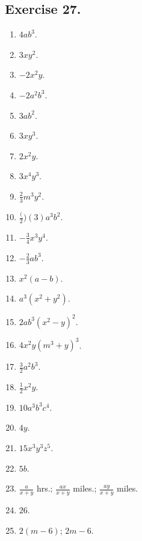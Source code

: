 \documentclass{book}
\begin{document}
\subsection*{Exercise 27.}
\begin{enumerate}

\item $4ab^3$.

\item $3xy^2$.

\item $- 2x^2y$.

\item $- 2a^2b^3$.

\item $3ab^2$.

\item $3xy^3$.

\item $2x^2y$.

\item $3x^4y^3$.

\item $\frac{2}{3} m^3y^2$.

\item $\frac(2)(3) a^3b^2$.

\item $- \frac{3}{4} x^3y^4$.

\item $- \frac{2}{3} ab^3$.

\item $x^2(a - b)$.

\item $a^3(x^2 + y^2)$.

\item $2ab^3\left(x^2 - y\right)^2$.

\item $4x^2y\left(m^3 + y\right)^3$.

\item $\frac{3}{2}a^2b^3$.

\item $\frac{1}{2}x^2y$.

\item $10a^3b^3c^4$.

\item $4y$.

\item $15x^3y^3z^5$.

\item $5b$.

\item $\displaystyle \frac{a}{x + y}$ hrs.; $\displaystyle
\frac{ax}{x + y}$ miles.; $\displaystyle \frac{ay}{x + y}$ miles.

\item $26$.

\item $2(m - 6)$; $2m - 6$.
\end{enumerate}
\end{document}
